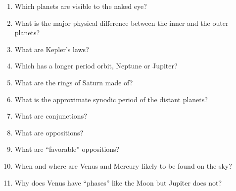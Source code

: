 
\begin{enumerate}
\item Which planets are visible to the naked eye?
\vspace{80pt}
\item What is the major physical difference between the inner and the
  outer planets?
\vspace{80pt}
\item What are Kepler's laws?
\vspace{120pt}
\item Which has a longer period orbit, Neptune or Jupiter?
\vspace{80pt}
\item What are the rings of Saturn made of?
\vspace{80pt}
\item What is the approximate synodic period of the distant planets?
\vspace{80pt}
\item What are conjunctions?
\vspace{80pt}
\item What are oppositions?
\vspace{80pt}
\item What are ``favorable'' oppositions?
\vspace{80pt}
\item When and where are Venus and Mercury likely to be found on the
  sky?
\vspace{80pt}
\item Why does Venus have ``phases'' like the Moon but Jupiter does
  not?
\vspace{80pt}
\end{enumerate}
